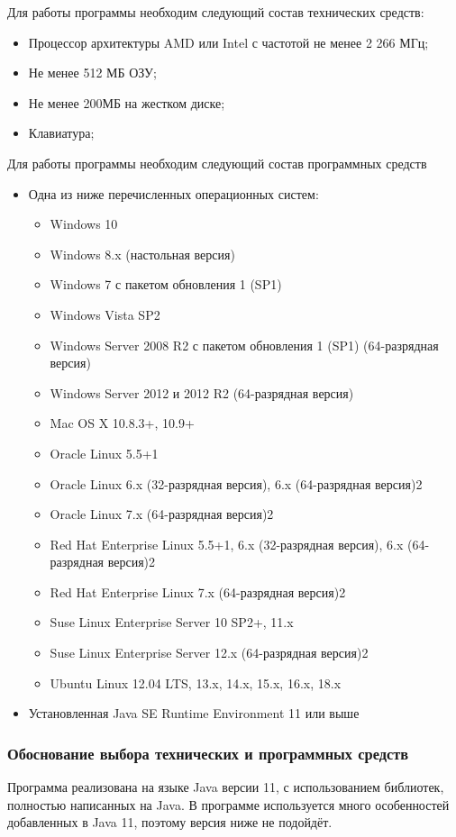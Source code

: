 \documentclass{../TechDoc}
\begin{document}
	 Для работы программы необходим следующий состав технических средств\cite{javareq}:
	 \begin{itemize}
	 	\item Процессор архитектуры AMD или Intel с частотой не менее 2 266 МГц;
	 	\item Не менее 512 МБ ОЗУ;
	 	\item Не менее 200МБ на жестком диске;
	 	\item Клавиатура;
	 \end{itemize}
	 
	 Для работы программы необходим следующий состав программных средств\cite{javareq}
	 \begin{itemize}
	 	\item Одна из ниже перечисленных операционных систем:
	 	\begin{itemize}
	 		\item Windows 10
	 		\item Windows 8.x (настольная версия)
	 		\item Windows 7 с пакетом обновления 1 (SP1)
	 		\item Windows Vista SP2
	 		\item Windows Server 2008 R2 с пакетом обновления 1 (SP1) (64-разрядная версия)
	 		\item Windows Server 2012 и 2012 R2 (64-разрядная версия)
	 		\item Mac OS X 10.8.3+, 10.9+
	 		\item Oracle Linux 5.5+1
	 		\item Oracle Linux 6.x (32-разрядная версия), 6.x (64-разрядная версия)2
	 		\item Oracle Linux 7.x (64-разрядная версия)2
	 		\item Red Hat Enterprise Linux 5.5+1, 6.x (32-разрядная версия), 6.x (64-разрядная версия)2
	 		\item Red Hat Enterprise Linux 7.x (64-разрядная версия)2
	 		\item Suse Linux Enterprise Server 10 SP2+, 11.x
	 		\item Suse Linux Enterprise Server 12.x (64-разрядная версия)2
	 		\item Ubuntu Linux 12.04 LTS, 13.x, 14.x, 15.x, 16.x, 18.x
	 	\end{itemize}
	 	\item Установленная Java SE Runtime Environment 11 или выше
	 \end{itemize}
	 
	 \subsubsection{Обоснование выбора технических и программных средств}
	 Программа реализована на языке Java версии 11\cite{Java11}, с использованием библиотек, полностью написанных на Java. В программе используется много особенностей добавленных в Java 11, поэтому версия ниже не подойдёт.
	 
\end{document}
